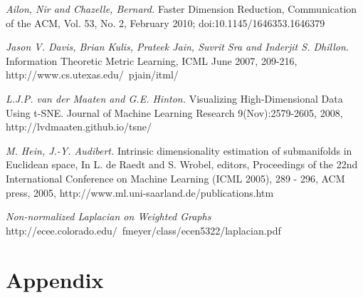 \documentclass[10pt]{article}
\begin{document}
\begin{thebibliography}{5}

\textit{Ailon, Nir and Chazelle, Bernard.} Faster Dimension Reduction, Communication of the ACM, Vol. 53, No. 2, February 2010;  doi:10.1145/1646353.1646379

\textit{Jason V. Davis, Brian Kulis, Prateek Jain, Suvrit Sra and Inderjit S. Dhillon.} Information Theoretic Metric Learning, ICML June 2007, 209-216,  http://www.cs.utexas.edu/~pjain/itml/

\textit{L.J.P. van der Maaten and G.E. Hinton.} Visualizing High-Dimensional Data Using t-SNE. Journal of Machine Learning Research 9(Nov):2579-2605, 2008, http://lvdmaaten.github.io/tsne/

\textit{M. Hein, J.-Y. Audibert. }Intrinsic dimensionality estimation of submanifolds in Euclidean space,
In L. de Raedt and S. Wrobel, editors, Proceedings of the 22nd International Conference on Machine Learning (ICML 2005), 289 - 296, ACM press, 2005, http://www.ml.uni-saarland.de/publications.htm

\textit{Non-normalized Laplacian on Weighted Graphs} http://ecee.colorado.edu/~fmeyer/class/ecen5322/laplacian.pdf

\end{thebibliography}

\section{Appendix}

\pagebreak
\end{document}
